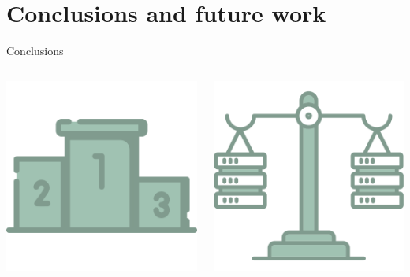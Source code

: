 \documentclass[9pt, pstricks, xcolor=dvipsnames]{beamer}
\begin{document}
\section{Conclusions and future work}
\frame{\insertsection}
\begin{frame}{Conclusions}

	\begin{columns}
		\begin{column}{0.33\textwidth}
			\centering
			\includegraphics[scale=0.2]{images/podium.png}
			\pause
		\end{column}
		\begin{column}{0.33\textwidth}
			\centering
			\includegraphics[scale=0.2]{images/load-balancer.png}

\end{column}
\end{columns}
\end{frame}
\end{document}
